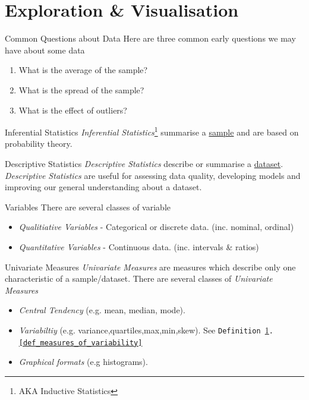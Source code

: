 \documentclass[11pt,a4paper]{article}
\begin{document}
\section{Exploration \& Visualisation}\label{sec_exploration_and_visualisation}

  \begin{remark}{Common Questions about Data}
    Here are three common early questions we may have about some data
    \begin{enumerate}
      \item What is the average of the sample?
      \item What is the spread of the sample?
      \item What is the effect of outliers?
    \end{enumerate}
  \end{remark}

  \begin{definition}{Inferential Statistics}
    \textit{Inferential Statistics}\footnote{AKA Inductive Statistics} summarise a \underline{sample} and are based on probability theory.
  \end{definition}

  \begin{definition}{Descriptive Statistics}
    \textit{Descriptive Statistics} describe or summarise a \underline{dataset}. \textit{Descriptive Statistics} are useful for assessing data quality, developing models and improving our general understanding about a dataset.
  \end{definition}

  \begin{definition}{Variables}
    There are several classes of variable
    \begin{itemize}
      \item \textit{Qualitiative Variables} - Categorical or discrete data. (inc. nominal, ordinal)
      \item \textit{Quantitative Variables} - Continuous data. (inc. intervals \& ratios)
    \end{itemize}
  \end{definition}

  \begin{definition}{Univariate Measures}
    \textit{Univariate Measures} are measures which describe only one characteristic of a sample/dataset. There are several classes of \textit{Univariate Measures}
    \begin{itemize}
      \item \textit{Central Tendency} (e.g. mean, median, mode).
      \item \textit{Variabiltiy} (e.g. variance,quartiles,max,min,skew). See \texttt{Definition \ref{sec_exploration_and_visualisation}.\ref{def_measures_of_variability}}
      \item \textit{Graphical formats} (e.g histograms).
    \end{itemize}
  \end{definition}
\end{document}
